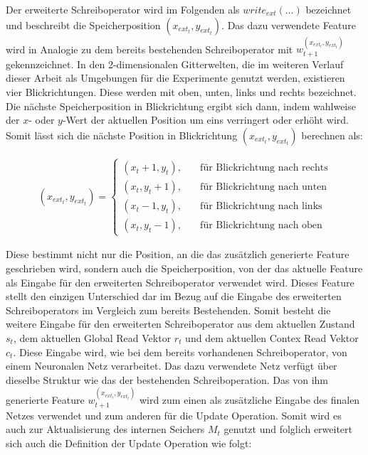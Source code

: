 Der erweiterte Schreiboperator wird im Folgenden als $write_{ext}(\dots)$ bezeichnet und beschreibt die Speicherposition $(x_{ext_t},y_{ext_t})$. Das dazu verwendete Feature wird in Analogie zu dem bereits bestehenden Schreiboperator mit $w_{t+1}^{(x_{ext_t},y_{ext_t})}$ gekennzeichnet. In den 2-dimensionalen Gitterwelten, die im weiteren Verlauf dieser Arbeit als Umgebungen für die Experimente genutzt werden, existieren vier Blickrichtungen. Diese werden mit oben, unten, links und rechts bezeichnet. Die nächste Speicherposition in Blickrichtung ergibt sich dann, indem wahlweise der $x$- oder $y$-Wert der aktuellen Position um eins verringert oder erhöht wird. Somit lässt sich die nächste Position in Blickrichtung $(x_{ext_t},y_{ext_t})$ berechnen als:

\begin{equation}
\begin{aligned}
(x_{ext_t}, y_{ext_t}) =
\begin{cases}
(x_t + 1,y_t), & \quad \text{für Blickrichtung nach rechts} \\
(x_t,y_t + 1), & \quad \text{für Blickrichtung nach unten} \\
(x_t - 1,y_t), & \quad \text{für Blickrichtung nach links} \\
(x_t,y_t - 1), & \quad \text{für Blickrichtung nach oben}
\end{cases}
\end{aligned}
\end{equation}

Diese bestimmt nicht nur die Position, an die das zusätzlich generierte Feature geschrieben wird, sondern auch die Speicherposition, von der das aktuelle Feature als Eingabe für den erweiterten Schreiboperator verwendet wird. Dieses Feature stellt den einzigen Unterschied dar im Bezug auf die Eingabe des erweiterten Schreiboperators im Vergleich zum bereits Bestehenden. Somit besteht die weitere Eingabe für den erweiterten Schreiboperator aus dem aktuellen Zustand $s_t$, dem aktuellen Global Read Vektor $r_t$ und dem aktuellen Contex Read Vektor $c_t$.
Diese Eingabe wird, wie bei dem bereits vorhandenen Schreiboperator, von einem Neuronalen Netz verarbeitet. Das dazu verwendete Netz verfügt über dieselbe Struktur wie das der bestehenden Schreiboperation. Das von ihm generierte Feature $w_{t+1}^{(x_{ext_t},y_{ext_t})}$ wird zum einen als zusätzliche Eingabe des finalen Netzes verwendet und zum anderen für die Update Operation. Somit wird es auch zur Aktualisierung des internen Seichers $M_t$ genutzt und folglich erweitert sich auch die Definition der Update Operation wie folgt:


